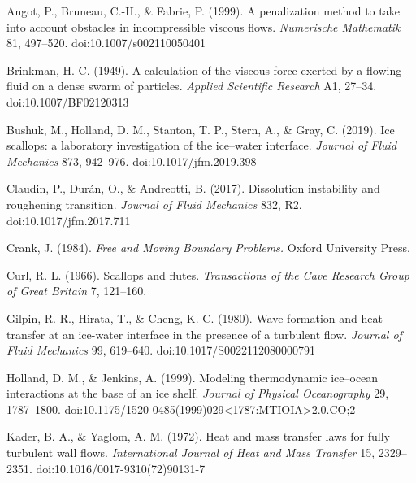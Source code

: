 \documentclass[tc, manuscript]{copernicus}
\begin{document}



\begin{thebibliography}{}
Angot, P., Bruneau, C.-H., \& Fabrie, P. (1999). A penalization method to take into account obstacles in incompressible viscous flows. \emph{Numerische Mathematik} 81, 497–520. doi:10.1007/s002110050401

Brinkman, H. C. (1949). A calculation of the viscous force exerted by a flowing fluid on a dense swarm of particles. \emph{Applied Scientific Research} A1, 27–34. doi:10.1007/BF02120313

Bushuk, M., Holland, D. M., Stanton, T. P., Stern, A., \& Gray, C. (2019). Ice scallops: a laboratory investigation of the ice–water interface. \emph{Journal of Fluid Mechanics} 873, 942–976. doi:10.1017/jfm.2019.398

Claudin, P., Durán, O., \& Andreotti, B. (2017). Dissolution instability and roughening transition. \emph{Journal of Fluid Mechanics} 832, R2. doi:10.1017/jfm.2017.711

Crank, J. (1984). \emph{Free and Moving Boundary Problems.} Oxford University Press.

Curl, R. L. (1966). Scallops and flutes. \emph{Transactions of the Cave Research Group of Great Britain} 7, 121–160.

Gilpin, R. R., Hirata, T., \& Cheng, K. C. (1980). Wave formation and heat transfer at an ice-water interface in the presence of a turbulent flow. \emph{Journal of Fluid Mechanics} 99, 619–640. doi:10.1017/S0022112080000791

Holland, D. M., \& Jenkins, A. (1999). Modeling thermodynamic ice–ocean interactions at the base of an ice shelf. \emph{Journal of Physical Oceanography} 29, 1787–1800. doi:10.1175/1520-0485(1999)029<1787:MTIOIA>2.0.CO;2

Kader, B. A., \& Yaglom, A. M. (1972). Heat and mass transfer laws for fully turbulent wall flows. \emph{International Journal of Heat and Mass Transfer} 15, 2329–2351. doi:10.1016/0017-9310(72)90131-7


\end{thebibliography}
\end{document}
